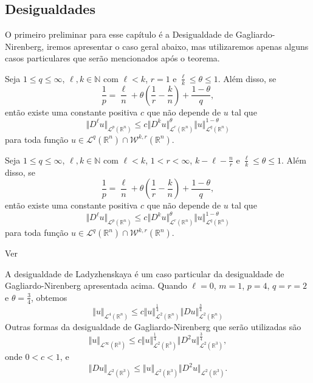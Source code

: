 \documentclass[a4paper, 11pt]{book}
\theoremstyle{definition}
\newcommand{\bN}{\mathbb{N}}
\newcommand{\bR}{\mathbb{R}}
\newcommand{\cL}{\mathcal{L}}
\newcommand{\cW}{\mathcal{W}}
\begin{document}
\subsection{Desigualdades}

O primeiro preliminar para esse capítulo é a Desigualdade de Gagliardo-Nirenberg, iremos apresentar o caso geral abaixo, mas utilizaremos apenas alguns casos particulares que serão mencionados após o teorema.
\begin{tbox}
    Seja $1 \leqslant q \leqslant \infty$, $\ell,k \in \bN$ com $\ell < k$, $r = 1$ e $\frac{\ell}{k} \leqslant \theta \leqslant 1$.
    Além disso, se
    \[
        \frac{1}{p} = \frac{\ell}{n} + \theta \left( \frac{1}{r} - \frac{k}{n} \right) + \frac{1 - \theta}{q},
    \]
    então existe uma constante positiva $c$ que não depende de $u$ tal que
    \[
        \Vert D^\ell u \Vert_{\cL^p(\bR^n)} \leqslant c \Vert D^k u \Vert_{\cL^r(\bR^n)}^\theta \Vert u \Vert_{\cL^q(\bR^n)}^{1-\theta}
    \]
    para toda função $u \in \cL^q(\bR^n) \cap \cW^{k,r}(\bR^n)$.    
\end{tbox}

\begin{tbox}
    Seja $1 \leqslant q \leqslant \infty$, $\ell,k \in \bN$ com $\ell < k$, $1 < r < \infty$, $k - \ell - \frac{n}{r}$ e $\frac{\ell}{k} \leqslant \theta \leqslant 1$.
    Além disso, se
    \[
        \frac{1}{p} = \frac{\ell}{n} + \theta \left( \frac{1}{r} - \frac{k}{n} \right) + \frac{1 - \theta}{q},
    \]
    então existe uma constante positiva $c$ que não depende de $u$ tal que
    \[
        \Vert D^\ell u \Vert_{\cL^p(\bR^n)} \leqslant c \Vert D^k u \Vert_{\cL^r(\bR^n)}^\theta \Vert u \Vert_{\cL^q(\bR^n)}^{1-\theta}
    \]
    para toda função $u \in \cL^q(\bR^n) \cap \cW^{k,r}(\bR^n)$.  
\end{tbox}
\begin{prf}
    Ver \cite{fiorenza-gns}
\end{prf}

A desigualdade de Ladyzhenskaya é um caso particular da desigualdade de Gagliardo-Nirenberg apresentada acima. Quando $\ell = 0$, $m = 1$, $p = 4$, $q = r = 2$ e $\theta = \frac{3}{4}$, obtemos
\begin{equation} \label{eq:gagliardoL4}
    \Vert u \Vert_{\cL^4(\bR^n)} \leqslant c \Vert u \Vert_{\cL^2(\bR^n)}^{\frac{1}{4}} \Vert Du \Vert_{\cL^2(\bR^n)}^{\frac{3}{4}}
\end{equation}
Outras formas da desigualdade de Gagliardo-Nirenberg que serão utilizadas são
\begin{equation} \label{eq:gagliardoinf}
    \Vert u \Vert_{\cL^\infty(\bR^3)} \leqslant c \Vert u \Vert_{\cL^2(\bR^3)}^{\frac{1}{4}} \Vert D^2 u \Vert_{\cL^2(\bR^3)}^{\frac{3}{4}},
\end{equation}
onde $0 < c < 1$, e
\begin{equation} \label{eq:gagliardoDu}
    \Vert Du \Vert_{\cL^2(\bR^3)} \leqslant \Vert u \Vert_{\cL^2(\bR^3)} \Vert D^2 u \Vert_{\cL^2(\bR^3)}.
\end{equation}
\end{document}
